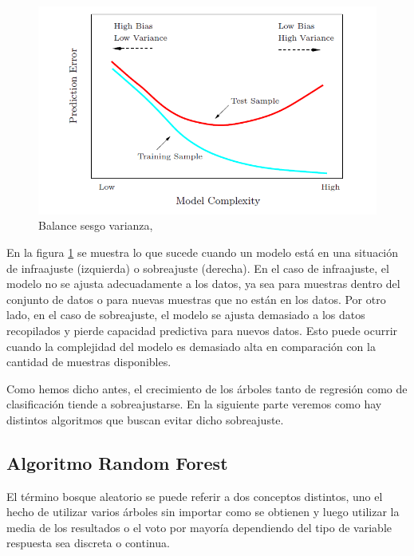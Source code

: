 \begin{figure}[h]
\centering
\includegraphics[scale=0.65]{Documentos Extra/Imagenes/Bias-Variance-Tradeoff.png}
\caption{Balance sesgo varianza, \cite{Hastie 2001}}
\label{fig:Balance-sesgo-varianza}
\end{figure}
 
\noindent En la figura \ref{fig:Balance-sesgo-varianza} se muestra lo que sucede cuando un modelo está en una situación de infraajuste (izquierda) o sobreajuste (derecha). En el caso de infraajuste, el modelo no se ajusta adecuadamente a los datos, ya sea para muestras dentro del conjunto de datos o para nuevas muestras que no están en los datos. Por otro lado, en el caso de sobreajuste, el modelo se ajusta demasiado a los datos recopilados y pierde capacidad predictiva para nuevos datos. Esto puede ocurrir cuando la complejidad del modelo es demasiado alta en comparación con la cantidad de muestras disponibles. 

\noindent Como hemos dicho antes, el crecimiento de los árboles tanto de regresión como de clasificación tiende a  sobreajustarse. En la siguiente parte veremos como hay distintos algoritmos que buscan evitar dicho sobreajuste. 

\newpage
\subsection{Algoritmo Random Forest}

\noindent El término bosque aleatorio se puede referir a dos conceptos distintos, uno el hecho de utilizar varios árboles sin importar como se obtienen y luego utilizar la media de los resultados o el voto por mayoría dependiendo del tipo de variable respuesta sea discreta o continua. 

